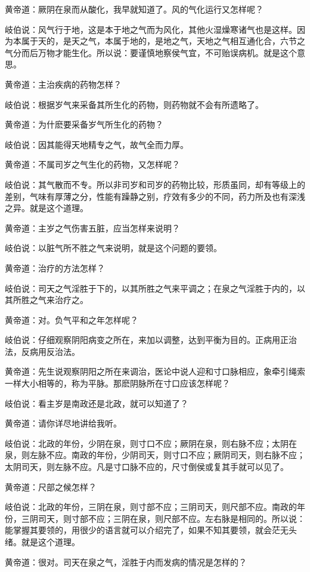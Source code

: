 \documentclass[12pt,UTF8]{ctexbook}
\begin{document}
黄帝道：厥阴在泉而从酸化，我早就知道了。风的气化运行又怎样呢？

岐伯说：风气行于地，这是本于地之气而为风化，其他火湿燥寒诸气也是这样。因为本属于天的，是天之气，本属于地的，是地之气，天地之气相互通化合，六节之气分而后万物才能生化。所以说：要谨慎地察侯气宜，不可贻误病机。就是这个意思。

黄帝道：主治疾病的药物怎样？

岐伯说：根据岁气来采备其所生化的药物，则药物就不会有所遗略了。

黄帝道：为什麽要采备岁气所生化的药物？

岐伯说：因其能得天地精专之气，故气全而力厚。

黄帝道：不属司岁之气生化的药物，又怎样呢？

岐伯说：其气散而不专。所以非司岁和司岁的药物比较，形质虽同，却有等级上的差别，气味有厚薄之分，性能有躁静之别，疗效有多少的不同，药力所及也有深浅之异。就是这个道理。

黄帝道：主岁之气伤害五脏，应当怎样来说明？

岐伯说：以脏气所不胜之气来说明，就是这个问题的要领。

黄帝道：治疗的方法怎样？

岐伯说：司天之气淫胜于下的，以其所胜之气来平调之；在泉之气淫胜于内的，以其所胜之气来治疗之。

黄帝道：对。负气平和之年怎样呢？

岐伯说：仔细观察阴阳病变之所在，来加以调整，达到平衡为目的。正病用正治法，反病用反治法。

黄帝道：先生说观察阴阳之所在来调治，医论中说人迎和寸口脉相应，象牵引绳索一样大小相等的，称为平脉。那麽阴脉所在寸口应该怎样呢？

岐伯说：看主岁是南政还是北政，就可以知道了？

黄帝道：请你详尽地讲给我听。

岐伯说：北政的年份，少阴在泉，则寸口不应；厥阴在泉，则右脉不应；太阴在泉，则左脉不应。南政的年份，少阴司天，则寸口不应；厥阴司天，则右脉不应；太阴司天，则左脉不应。凡是寸口脉不应的，尺寸倒侯或复其手就可以见了。

黄帝道：尺部之候怎样？

岐伯说：北政的年份，三阴在泉，则寸部不应；三阴司天，则尺部不应。南政的年份，三阴司天，则寸部不应；三阴在泉，则尺部不应。左右脉是相同的。所以说：能掌握其要领的，用很少的语言就可以介绍完了，如果不知其要领，就会茫无头绪。就是这个道理。

黄帝道：很对。司天在泉之气，淫胜于内而发病的情况是怎样的？
\end{document}
